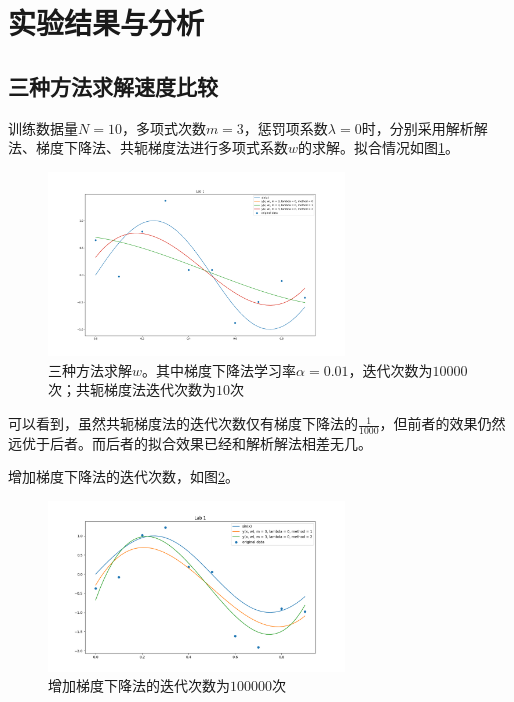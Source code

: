 \section{实验结果与分析}

\subsection{三种方法求解速度比较}

训练数据量$N = 10$，多项式次数$m = 3$，惩罚项系数$\lambda = 0$时，分别采用解析解法、梯度下降法、共轭梯度法进行多项式系数$w$的求解。拟合情况如图\ref{methods}。

\begin{figure}[htbp]
    \centering
    \includegraphics[width=0.7\textwidth]{figures/Figure_11.png}
    \caption{三种方法求解$w$。其中梯度下降法学习率$\alpha = 0.01$，迭代次数为$10000$次；共轭梯度法迭代次数为$10$次}
    \label{methods}
\end{figure}

可以看到，虽然共轭梯度法的迭代次数仅有梯度下降法的$\frac{1}{1000}$，但前者的效果仍然远优于后者。而后者的拟合效果已经和解析解法相差无几。

增加梯度下降法的迭代次数，如图\ref{methods1}。

\begin{figure}[htbp]
    \centering
    \includegraphics[width=0.7\textwidth]{figures/Figure_12.png}
    \caption{增加梯度下降法的迭代次数为$100000$次}
    \label{methods1}
\end{figure}

